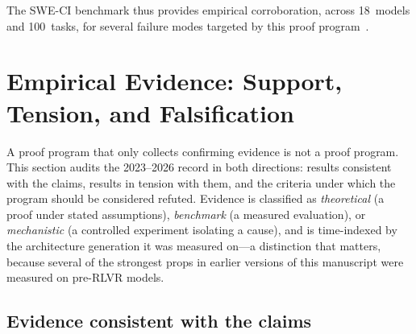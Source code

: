 \documentclass[11pt,a4paper]{article}
\begin{document}
The SWE-CI benchmark thus provides empirical corroboration, across 18~models and 100~tasks, for several failure modes targeted by this proof program~\cite{chen2025sweci,shumailov2024model}.

\section{Empirical Evidence: Support, Tension, and Falsification}
\label{sec:empirical}

A proof program that only collects confirming evidence is not a proof program. This section audits the 2023--2026 record in both directions: results consistent with the claims, results in tension with them, and the criteria under which the program should be considered refuted. Evidence is classified as \emph{theoretical} (a proof under stated assumptions), \emph{benchmark} (a measured evaluation), or \emph{mechanistic} (a controlled experiment isolating a cause), and is time-indexed by the architecture generation it was measured on---a distinction that matters, because several of the strongest props in earlier versions of this manuscript were measured on pre-RLVR models.

\subsection{Evidence consistent with the claims}
\end{document}
